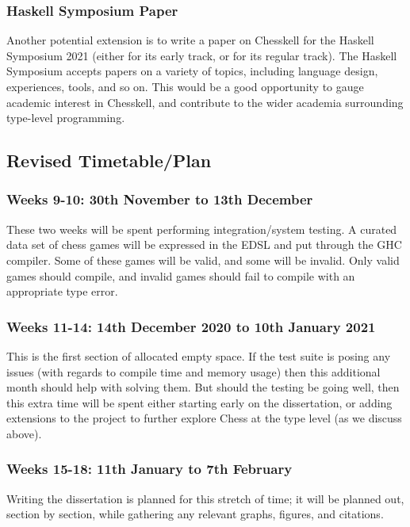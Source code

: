 \documentclass[12pt, a4paper, bibliography=totocnumbered]{scrartcl}
\begin{document}
\subsubsection{Haskell Symposium Paper}

Another potential extension is to write a paper on Chesskell for the Haskell Symposium 2021 (either for its early track, or for its regular track). The Haskell Symposium accepts papers on a variety of topics, including language design, experiences, tools, and so on. This would be a good opportunity to gauge academic interest in Chesskell, and contribute to the wider academia surrounding type-level programming.

\subsection{Revised Timetable/Plan}

\subsubsection{Weeks 9-10: 30th November to 13th December}

These two weeks will be spent performing integration/system testing. A curated data set of chess games will be expressed in the EDSL and put through the GHC compiler. Some of these games will be valid, and some will be invalid. Only valid games should compile, and invalid games should fail to compile with an appropriate type error.

\subsubsection{Weeks 11-14: 14th December 2020 to 10th January 2021}

This is the first section of allocated empty space. If the test suite is posing any issues (with regards to compile time and memory usage) then this additional month should help with solving them. But should the testing be going well, then this extra time will be spent either starting early on the dissertation, or adding extensions to the project to further explore Chess at the type level (as we discuss above).

\subsubsection{Weeks 15-18: 11th January to 7th February}

Writing the dissertation is planned for this stretch of time; it will be planned out, section by section, while gathering any relevant graphs, figures, and citations.
\end{document}
